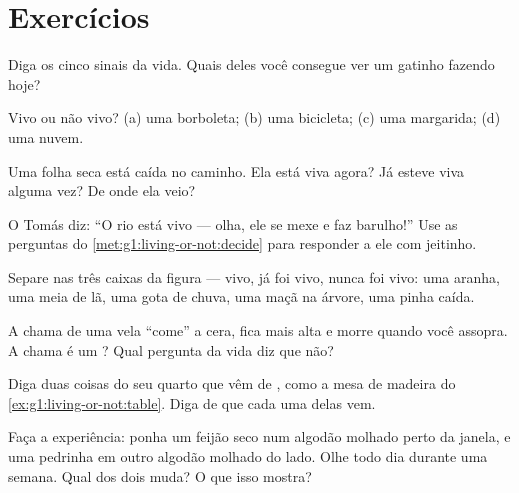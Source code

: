 \section{Exercícios}

\begin{exercise}[$\star$]\label{exo:g1:living-or-not:1}
Diga os cinco sinais da vida. Quais deles você consegue ver um
gatinho fazendo hoje?
\end{exercise}

\begin{exercise}[$\star$]\label{exo:g1:living-or-not:2}
Vivo ou não vivo? (a) uma borboleta; (b) uma bicicleta; (c) uma
margarida; (d) uma nuvem.
\end{exercise}

\begin{exercise}[$\star$]\label{exo:g1:living-or-not:3}
Uma folha seca está caída no caminho. Ela está viva agora? Já esteve
viva alguma vez? De onde ela veio?
\end{exercise}

\begin{exercise}[$\star$]\label{exo:g1:living-or-not:4}
O Tomás diz: ``O rio está vivo --- olha, ele se mexe e faz
barulho!'' Use as perguntas do \cref{met:g1:living-or-not:decide}
para responder a ele com jeitinho.
\end{exercise}

\begin{exercise}[$\star$]\label{exo:g1:living-or-not:5}
Separe nas três caixas da figura --- vivo, já foi vivo, nunca foi
vivo: uma aranha, uma meia de lã, uma gota de chuva, uma maçã na
árvore, uma pinha caída.
\end{exercise}

\begin{exercise}[$\star$]\label{exo:g1:living-or-not:6}
A chama de uma vela ``come'' a cera, fica mais alta e morre quando
você assopra. A chama é um ? Qual pergunta da vida diz que
não?
\end{exercise}

\begin{exercise}[$\star$]\label{exo:g1:living-or-not:7}
Diga duas coisas do seu quarto que vêm de , como a mesa
de madeira do \cref{ex:g1:living-or-not:table}. Diga de que 
cada uma delas vem.
\end{exercise}

\begin{exercise}[$\star$]\label{exo:g1:living-or-not:8}
Faça a experiência: ponha um feijão seco num algodão molhado perto
da janela, e uma pedrinha em outro algodão molhado do lado. Olhe
todo dia durante uma semana. Qual dos dois muda? O que isso mostra?
\end{exercise}

